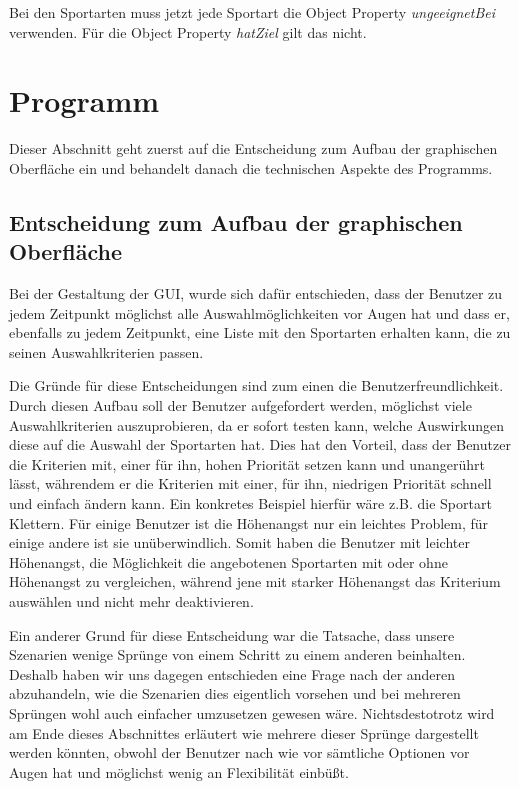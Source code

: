 Bei den Sportarten muss jetzt jede Sportart die Object Property \textit{ungeeignetBei} verwenden. Für die Object Property \textit{hatZiel} gilt das nicht.




\section{Programm}

Dieser Abschnitt geht zuerst auf die Entscheidung zum Aufbau der graphischen Oberfläche ein und behandelt danach die technischen Aspekte des Programms. 

\subsection{Entscheidung zum Aufbau der graphischen Oberfläche}
Bei der Gestaltung der GUI, wurde sich dafür entschieden, dass der Benutzer zu jedem Zeitpunkt möglichst alle Auswahlmöglichkeiten vor Augen hat und dass er, ebenfalls zu jedem Zeitpunkt, eine Liste mit den Sportarten erhalten kann, die zu seinen Auswahlkriterien passen.

Die Gründe für diese Entscheidungen sind zum einen die Benutzerfreundlichkeit. Durch diesen Aufbau soll der Benutzer aufgefordert werden, möglichst viele Auswahlkriterien auszuprobieren, da er sofort testen kann, welche Auswirkungen diese auf die Auswahl der Sportarten hat. Dies hat den Vorteil, dass der Benutzer die Kriterien mit, einer für ihn, hohen Priorität setzen kann und unangerührt lässt, währendem er die Kriterien mit einer, für ihn, niedrigen Priorität schnell und einfach ändern kann. Ein konkretes Beispiel hierfür wäre z.B. die Sportart Klettern. Für einige Benutzer ist die Höhenangst nur ein leichtes Problem, für einige andere ist sie unüberwindlich. Somit haben die Benutzer mit leichter Höhenangst, die Möglichkeit die angebotenen Sportarten mit oder ohne Höhenangst zu vergleichen, während jene mit starker Höhenangst das Kriterium auswählen und nicht mehr deaktivieren.

Ein anderer Grund für diese Entscheidung war die Tatsache, dass unsere Szenarien wenige Sprünge von einem Schritt zu einem anderen beinhalten. Deshalb haben wir uns dagegen entschieden eine Frage nach der anderen abzuhandeln, wie die Szenarien dies eigentlich vorsehen und bei mehreren Sprüngen wohl auch einfacher umzusetzen gewesen wäre. Nichtsdestotrotz wird am Ende dieses Abschnittes erläutert wie mehrere dieser Sprünge dargestellt werden könnten, obwohl der Benutzer nach wie vor sämtliche Optionen vor Augen hat und möglichst wenig an Flexibilität einbüßt.

